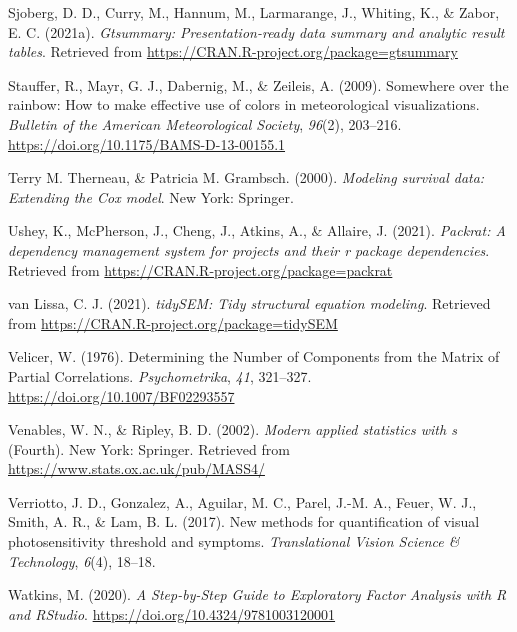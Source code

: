 \documentclass[
  english,
  man]{apa6}
\newlength{\cslhangindent}
\newlength{\cslentryspacingunit} %
\newenvironment{CSLReferences}[2] %
 {%
  \setlength{\parindent}{0pt}
  \ifodd #1
  \let\oldpar\par
  \def\par{\hangindent=\cslhangindent\oldpar}
  \fi
  \setlength{\parskip}{#2\cslentryspacingunit}
 }%
 {}
\begin{document}
\begin{CSLReferences}{1}{0}
\leavevmode{}%
Sjoberg, D. D., Curry, M., Hannum, M., Larmarange, J., Whiting, K., \& Zabor, E. C. (2021a). \emph{Gtsummary: Presentation-ready data summary and analytic result tables}. Retrieved from \url{https://CRAN.R-project.org/package=gtsummary}

\leavevmode{}%
Stauffer, R., Mayr, G. J., Dabernig, M., \& Zeileis, A. (2009). Somewhere over the rainbow: How to make effective use of colors in meteorological visualizations. \emph{Bulletin of the American Meteorological Society}, \emph{96}(2), 203--216. \url{https://doi.org/10.1175/BAMS-D-13-00155.1}

\leavevmode{}%
Terry M. Therneau, \& Patricia M. Grambsch. (2000). \emph{Modeling survival data: Extending the {C}ox model}. New York: Springer.

\leavevmode{}%
Ushey, K., McPherson, J., Cheng, J., Atkins, A., \& Allaire, J. (2021). \emph{Packrat: A dependency management system for projects and their r package dependencies}. Retrieved from \url{https://CRAN.R-project.org/package=packrat}

\leavevmode{}%
van Lissa, C. J. (2021). \emph{tidySEM: Tidy structural equation modeling}. Retrieved from \url{https://CRAN.R-project.org/package=tidySEM}

\leavevmode{}%
Velicer, W. (1976). Determining the {Number} of {Components} from the {Matrix} of {Partial Correlations}. \emph{Psychometrika}, \emph{41}, 321--327. \url{https://doi.org/10.1007/BF02293557}

\leavevmode{}%
Venables, W. N., \& Ripley, B. D. (2002). \emph{Modern applied statistics with s} (Fourth). New York: Springer. Retrieved from \url{https://www.stats.ox.ac.uk/pub/MASS4/}

\leavevmode{}%
Verriotto, J. D., Gonzalez, A., Aguilar, M. C., Parel, J.-M. A., Feuer, W. J., Smith, A. R., \& Lam, B. L. (2017). New methods for quantification of visual photosensitivity threshold and symptoms. \emph{Translational Vision Science \& Technology}, \emph{6}(4), 18--18.

\leavevmode{}%
Watkins, M. (2020). \emph{A {Step}-by-{Step Guide} to {Exploratory Factor Analysis} with {R} and {RStudio}}. \url{https://doi.org/10.4324/9781003120001}


\end{CSLReferences}
\end{document}
